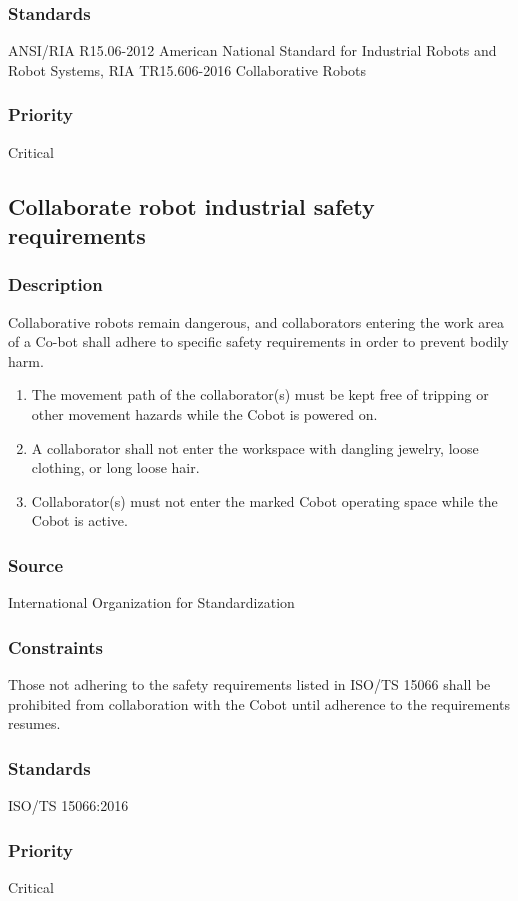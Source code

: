 \subsubsection{Standards}
ANSI/RIA R15.06-2012 American National Standard for Industrial Robots and Robot Systems, RIA TR15.606-2016 Collaborative Robots
\subsubsection{Priority}
Critical

\subsection{Collaborate robot industrial safety requirements}
\subsubsection{Description}
Collaborative robots remain dangerous, and collaborators entering the work area of a Co-bot shall adhere to specific safety requirements in order to prevent bodily harm. 
\begin{enumerate}
  \item The movement path of the collaborator(s) must be kept free of tripping or other movement hazards while the Cobot is powered on.
  \item A collaborator shall not enter the workspace with dangling jewelry, loose clothing, or long loose hair.
  \item Collaborator(s) must not enter the marked Cobot operating space while the Cobot is active.
\end{enumerate}
\subsubsection{Source}
International Organization for Standardization
\subsubsection{Constraints}
    Those not adhering to the safety requirements listed in ISO/TS 15066 shall be prohibited from collaboration with the Cobot until adherence to the requirements resumes.
\subsubsection{Standards}
ISO/TS 15066:2016
\subsubsection{Priority}
Critical

